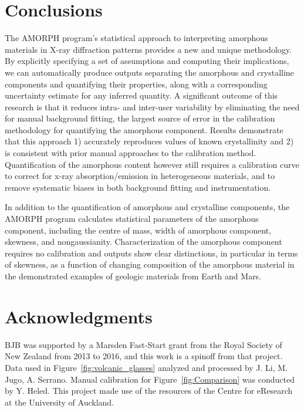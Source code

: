 \documentclass[preprint, a4paper]{elsarticle}
\begin{document}
\section{Conclusions}\label{sec:conclusions}
The AMORPH program’s statistical approach to interpreting amorphous materials in X-ray
diffraction patterns provides a new and unique methodology.
By explicitly specifying a set of assumptions and computing their
implications, we can automatically produce outputs separating the
amorphous and crystalline components and quantifying their properties,
along with a corresponding uncertainty estimate for any inferred
quantity.
A significant outcome of this research is that it reduces intra- and inter-user variability
by eliminating the need for manual background fitting, the largest source of error in the
calibration methodology for quantifying the amorphous component. Results demonstrate that
this approach 1) accurately reproduces values of known crystallinity and 2) is consistent
with prior manual approaches to the calibration method. Quantification of the amorphous
content however still requires a calibration curve to correct for x-ray absorption/emission
in heterogeneous materials, and to remove systematic biases in both background fitting and instrumentation. 

In addition to the quantification of amorphous and crystalline components, the AMORPH
program calculates statistical parameters of the amorphous component, including the centre
of mass, width of amorphous component, skewness, and nongaussianity. Characterization of the amorphous component requires no calibration and outputs show 
clear distinctions, in particular in terms of skewness, as a function of changing composition of the amorphous material in the demonstrated examples of
geologic materials from Earth and Mars.


\section*{Acknowledgments}

BJB was supported by a Marsden Fast-Start grant from the Royal Society of
New Zealand from 2013 to 2016, and this work is a spinoff from that
project. Data used in Figure~\ref{fig:volcanic_glasses} analyzed and processed by J. Li, M. Jugo, A. Serrano. Manual calibration for Figure~\ref{fig:Comparison} was conducted by Y. Heled. This project made use of the resources of the Centre for
eResearch at the University of Auckland.
\end{document}
